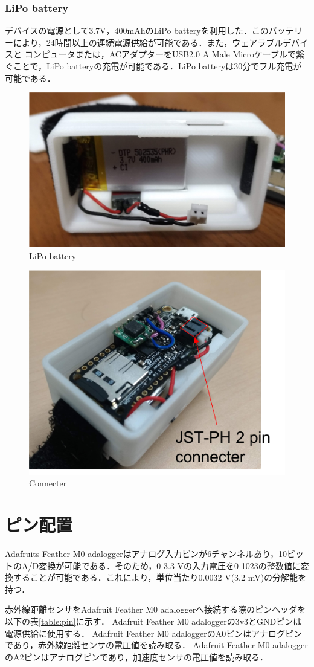 \subsubsection*{LiPo battery}
デバイスの電源として3.7V，400mAhのLiPo batteryを利用した．このバッテリーにより，24時間以上の連続電源供給が可能である．また，ウェアラブルデバイスと
コンピュータまたは，ACアダプターをUSB2.0 A Male Microケーブルで繋ぐことで，LiPo batteryの充電が可能である．LiPo batteryは30分でフル充電が可能である．
\begin{figure}[H]
  \centering
  \includegraphics[width=0.5\linewidth]{fig/battery}
  \caption{LiPo battery}
  \label{fig:battery}
\end{figure}

\begin{figure}[H]
  \centering
  \includegraphics[width=0.5\linewidth]{fig/ph}
  \caption{Connecter}
  \label{fig:connecter}
\end{figure}

\section{ピン配置}
Adafruits Feather M0 adaloggerはアナログ入力ピンが6チャンネルあり，10ビットのA/D変換が可能である．そのため，0-3.3 Vの入力電圧を0-1023の整数値に変換することが可能である．これにより，単位当たり0.0032 V(3.2 mV)の分解能を持つ．

赤外線距離センサをAdafruit Feather M0 adaloggerへ接続する際のピンヘッダを以下の表\ref{table:pin}に示す．
Adafruit Feather M0 adaloggerの3v3とGNDピンは電源供給に使用する．
Adafruit Feather M0 adaloggerのA0ピンはアナログピンであり，赤外線距離センサの電圧値を読み取る．
Adafruit Feather M0 adaloggerのA2ピンはアナログピンであり，加速度センサの電圧値を読み取る．


